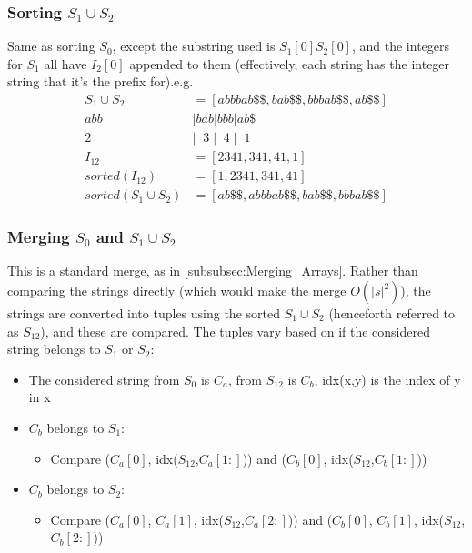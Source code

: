 \subsubsection{Sorting $S_1 \cup S_2$}
Same as sorting $S_0$, except the substring used is $S_1[0]S_2[0]$, and the integers for $S_1$ all have $I_2[0]$ appended to them (effectively, each string has the integer string that it's the prefix for).e.g.
\begin{align}
    S_1 \cup S_2 &= [abbbab\$\$, bab\$\$, bbbab\$\$, ab\$\$] \nonumber \\
    abb&|bab|bbb|ab\$ \nonumber \\
     2\; &|\;\;3\;|\;\;4\;|\;\;1  \nonumber \\
    I_{12} &= [2341,341,41,1] \nonumber \\
    sorted(I_{12}) &= [1,2341,341,41] \nonumber \\
    sorted(S_1 \cup S_2) &= [ab\$\$, abbbab\$\$, bab\$\$, bbbab\$\$] \nonumber 
\end{align}

\subsubsection{Merging $S_0$ and $S_1 \cup S_2$}
This is a standard merge, as in \ref{subsubsec:Merging_Arrays}. Rather than comparing the strings directly (which would make the merge $O(|s|^2)$), the strings are converted into tuples using the sorted $S_1 \cup S_2$ (henceforth referred to as $S_{12}$), and these are compared. The tuples vary based on if the considered string belongs to $S_1$ or $S_2$:
\begin{itemize}
    \item The considered string from $S_0$ is $C_a$, from $S_{12}$ is $C_b$, idx(x,y) is the index of y in x
    \item $C_b$ belongs to $S_1$:
    \begin{itemize}
        \item Compare ($C_a[0]$, idx($S_{12}$,$C_a[1:]$)) and ($C_b[0]$, idx($S_{12}$,$C_b[1:]$))
    \end{itemize}
    \item $C_b$ belongs to $S_2$:
    \begin{itemize}
        \item Compare ($C_a[0]$, $C_a[1]$, idx($S_{12}$,$C_a[2:]$)) and ($C_b[0]$, $C_b[1]$, idx($S_{12}$,$C_b[2:]$))
    \end{itemize}    
\end{itemize}

